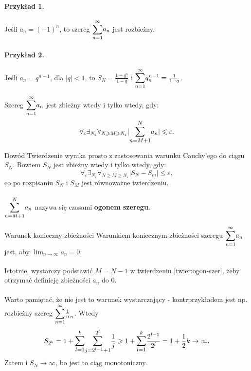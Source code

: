 \documentclass{article}
\newcounter{defi}
\numberwithin{defi}{section}
\numberwithin{defi}{section}
\newcommand{\oo}{\infty}
\providecommand{\eps}{\varepsilon}
\providecommand{\half}{\frac{1}{2}}
\newcommand{\bsum}[2]{\mathlarger{\sum_{#1}^{#2}}}
\newcommand{\szerI}[1]{\bsum{n=1}{\oo} #1_n}
\newcommand{\gras}[2]{\lim_{#1 \to \oo} #2_{#1}}
\begin{document}
\paragraph*{Przykład 1.} Jeśli $a_n = (-1)^n$, to szereg $\szerI{a}$ jest rozbieżny.
\paragraph*{Przykład 2.} Jeśli $a_n = q^{n-1}$, dla $|q| < 1$, to $S_N = \frac{1 - q^n}{1 - q}$ i $\szerI{q^{n-1}} = \frac{1}{1-q}$.


\begin{twier}{} \label{twier:ogon-szer}
    Szereg $\szerI{a}$ jest zbieżny wtedy i tylko wtedy, gdy: \begin{equation}
        \forall_\eps \exists_{N_\eps} \forall_{N \geqslant M \geqslant N_\eps} | \bsum{n= M+1}{N} a_n | \leqslant \eps.
    \end{equation} 
\end{twier}
\begin{dow}{Dowód}
    Twierdzenie wynika prosto z zastosowania warunku Cauchy'ego do ciągu $S_N$. Bowiem $S_N$ jest zbieżny wtedy i tylko wtedy, gdy:\begin{equation}
        \forall_\eps \exists_{N_\eps} \forall_{N \geqslant M \geqslant N_\eps} |S_N - S_m| \leqslant \eps,
    \end{equation} co po rozpisaniu $S_N$ i $S_M$ jest równoważne twierdzeniu.
\end{dow}
\paragraph*{} $\bsum{n= M+1}{N} a_n$ nazywa się czasami \textbf{ogonem szeregu}. 
\begin{obs}{Warunek konieczny zbieżności}
    Warunkiem koniecznym zbieżności szeregu $\szerI{a}$ jest, aby $\gras{n}{a} = 0$.
\end{obs}
\paragraph{} Istotnie, wystarczy podstawić $M = N-1$ w twierdzeniu \ref{twier:ogon-szer}, żeby otrzymać definicję zbieżności $a_n$ do 0.
\paragraph{} Warto pamiętać, że nie jest to warunek wystarczający - kontrprzykładem jest np. rozbieżny szereg $\szerI{\frac{1}{n}}$. Wtedy\begin{equation}
    S_{2^k} = 1 + \bsum{l = 1}{k} \bsum{j = 2^{l-1} +1}{2^{l}} \frac{1}{j} \geqslant1 +  \bsum{l = 1}{k} \frac{2^{l-1}}{2^l} = 1 + \half k \to \oo. 
\end{equation} Zatem i $S_N \to \oo$, bo jest to ciąg monotoniczny.
\end{document}
